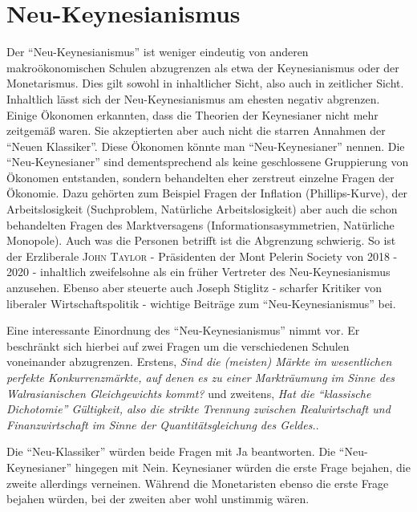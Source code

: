 %
%
%

\chapter{Neu-Keynesianismus} \label{cha: Neu Keynes}

Der "`Neu-Keynesianismus"' ist weniger eindeutig von anderen makroökonomischen Schulen abzugrenzen als etwa der Keynesianismus oder der Monetarismus. Dies gilt sowohl in inhaltlicher Sicht, also auch in zeitlicher Sicht. Inhaltlich lässt sich der Neu-Keynesianismus am ehesten negativ abgrenzen. Einige Ökonomen erkannten, dass die Theorien der Keynesianer nicht mehr zeitgemäß waren. Sie akzeptierten aber auch nicht die starren Annahmen der "`Neuen Klassiker"'. Diese Ökonomen könnte man "`Neu-Keynesianer"' nennen. Die "`Neu-Keynesianer"' sind dementsprechend als keine geschlossene Gruppierung von Ökonomen entstanden, sondern behandelten eher zerstreut einzelne Fragen der Ökonomie. Dazu gehörten zum Beispiel Fragen der Inflation (Phillips-Kurve), der Arbeitslosigkeit (Suchproblem, Natürliche Arbeitslosigkeit) aber auch die schon behandelten Fragen des Marktversagens (Informationsasymmetrien, Natürliche Monopole). 
Auch was die Personen betrifft ist die Abgrenzung schwierig. So ist der Erzliberale \textsc{John Taylor} - Präsidenten der Mont Pelerin Society von 2018 - 2020 - inhaltlich zweifelsohne als ein früher Vertreter des Neu-Keynesianismus anzusehen. Ebenso aber steuerte auch Joseph Stiglitz - scharfer Kritiker von liberaler Wirtschaftspolitik - wichtige Beiträge zum "`Neu-Keynesianismus"' bei.

Eine interessante Einordnung des "`Neu-Keynesianismus"' nimmt \textcite[S. 21]{RomerDavid1993} vor. Er beschränkt sich hierbei auf zwei Fragen um die verschiedenen Schulen voneinander abzugrenzen. Erstens, \textit{Sind die (meisten) Märkte im wesentlichen perfekte Konkurrenzmärkte, auf denen es zu einer Markträumung im Sinne des Walrasianischen Gleichgewichts kommt?} und zweitens, \textit{Hat die "`klassische Dichotomie"' Gültigkeit, also die strikte Trennung zwischen Realwirtschaft und Finanzwirtschaft im Sinne der Quantitätsgleichung des Geldes.}.

Die "`Neu-Klassiker"' würden beide Fragen mit Ja beantworten. Die "`Neu-Keynesianer"' hingegen mit Nein. Keynesianer würden die erste Frage bejahen, die zweite allerdings verneinen. Während die Monetaristen ebenso die erste Frage bejahen würden, bei der zweiten aber wohl unstimmig wären.

